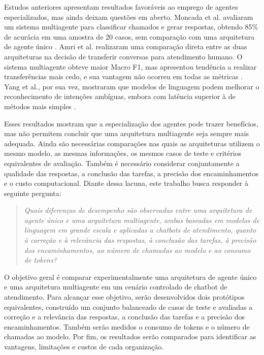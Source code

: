 \documentclass[11pt]{ifscarticle}
\begin{document}
Estudos anteriores apresentam resultados favoráveis ao emprego de agentes especializados, mas ainda deixam questões em aberto. Moncada et al. avaliaram um sistema multiagente para classificar chamados e gerar respostas, obtendo 85\% de acurácia em uma amostra de 20 casos, sem comparação com uma arquitetura de agente único \cite{c.moncadaLargeLanguageModels2025a}. Amri et al. realizaram uma comparação direta entre as duas arquiteturas na decisão de transferir conversas para atendimento humano. O sistema multiagente obteve maior Macro F1, mas apresentou tendência a realizar transferências mais cedo, e sua vantagem não ocorreu em todas as métricas \cite{m.f.amriOptimizingLLMChatbot2026a}. Yang et al., por sua vez, mostraram que modelos de linguagem podem melhorar o reconhecimento de intenções ambíguas, embora com latência superior à de métodos mais simples \cite{w.yangTwoStageIntentRecognition2025a}.

Esses resultados mostram que a especialização dos agentes pode trazer benefícios, mas não permitem concluir que uma arquitetura multiagente seja sempre mais adequada. Ainda são necessárias comparações nas quais as arquiteturas utilizem o mesmo modelo, as mesmas informações, os mesmos casos de teste e critérios equivalentes de avaliação. Também é necessário considerar conjuntamente a qualidade das respostas, a conclusão das tarefas, a precisão dos encaminhamentos e o custo computacional. Diante dessa lacuna, este trabalho busca responder à seguinte pergunta:

\begin{quote}
\textit{Quais diferenças de desempenho são observadas entre uma arquitetura de agente único e uma arquitetura multiagente, ambas baseadas em modelos de linguagem em grande escala e aplicadas a chatbots de atendimento, quanto à correção e à relevância das respostas, à conclusão das tarefas, à precisão dos encaminhamentos, ao número de chamadas ao modelo e ao consumo de tokens?}
\end{quote}

O objetivo geral é comparar experimentalmente uma arquitetura de agente único e uma arquitetura multiagente em um cenário controlado de chatbot de atendimento. Para alcançar esse objetivo, serão desenvolvidos dois protótipos equivalentes, construído um conjunto balanceado de casos de teste e avaliadas a correção e a relevância das respostas, a conclusão das tarefas e a precisão dos encaminhamentos. Também serão medidos o consumo de tokens e o número de chamadas ao modelo. Por fim, os resultados serão comparados para identificar as vantagens, limitações e custos de cada organização.
\end{document}

